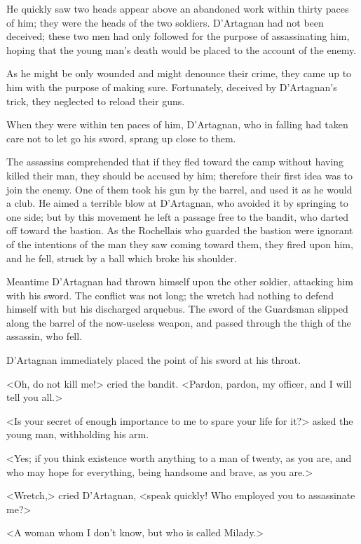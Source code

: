 He quickly saw two heads appear above an abandoned work within thirty paces of him; they were the heads of the two soldiers. D'Artagnan had not been deceived; these two men had only followed for the purpose of assassinating him, hoping that the young man's death would be placed to the account of the enemy. 

As he might be only wounded and might denounce their crime, they came up to him with the purpose of making sure. Fortunately, deceived by D'Artagnan's trick, they neglected to reload their guns. 

When they were within ten paces of him, D'Artagnan, who in falling had taken care not to let go his sword, sprang up close to them. 

The assassins comprehended that if they fled toward the camp without having killed their man, they should be accused by him; therefore their first idea was to join the enemy. One of them took his gun by the barrel, and used it as he would a club. He aimed a terrible blow at D'Artagnan, who avoided it by springing to one side; but by this movement he left a passage free to the bandit, who darted off toward the bastion. As the Rochellais who guarded the bastion were ignorant of the intentions of the man they saw coming toward them, they fired upon him, and he fell, struck by a ball which broke his shoulder. 

Meantime D'Artagnan had thrown himself upon the other soldier, attacking him with his sword. The conflict was not long; the wretch had nothing to defend himself with but his discharged arquebus. The sword of the Guardsman slipped along the barrel of the now-useless weapon, and passed through the thigh of the assassin, who fell. 

D'Artagnan immediately placed the point of his sword at his throat. 

<Oh, do not kill me!> cried the bandit. <Pardon, pardon, my officer, and I will tell you all.> 

<Is your secret of enough importance to me to spare your life for it?> asked the young man, withholding his arm. 

<Yes; if you think existence worth anything to a man of twenty, as you are, and who may hope for everything, being handsome and brave, as you are.> 

<Wretch,> cried D'Artagnan, <speak quickly! Who employed you to assassinate me?> 

<A woman whom I don't know, but who is called Milady.> 

